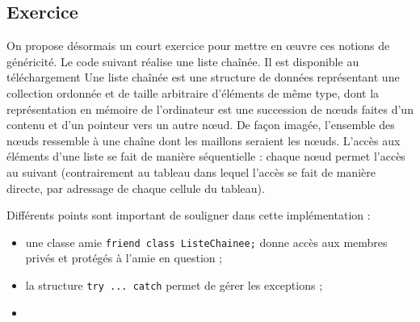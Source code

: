 \documentclass[abstracton]{scrartcl}
\newcommand*{\rootPath}{../}
\begin{document}



\subsection{Exercice}

On propose désormais un court exercice pour mettre en œuvre ces notions de généricité.
Le code suivant  réalise une liste chaînée. Il est disponible au téléchargement \cite{listeChainee}
Une liste chaînée est une structure de données représentant une collection ordonnée et de taille arbitraire d'éléments de même type, dont la représentation en mémoire de l'ordinateur est une succession de nœuds faites d'un contenu et d'un pointeur vers un autre nœud.
De façon imagée, l'ensemble des nœuds ressemble à une chaîne dont les maillons seraient les nœuds.
L'accès aux éléments d'une liste se fait de manière séquentielle : chaque nœud permet l'accès au suivant (contrairement au tableau dans lequel l'accès se fait de manière directe, par adressage de chaque cellule du tableau).
%
%




Différents points sont important de souligner dans cette implémentation :
\begin{itemize}
    \item une classe amie \lstinline{friend class ListeChainee;} donne accès aux membres privés et protégés à l'amie en question ;
    \item la structure	\lstinline{try ... catch} permet de gérer les exceptions ;
    \item
\end{itemize}
\end{document}
